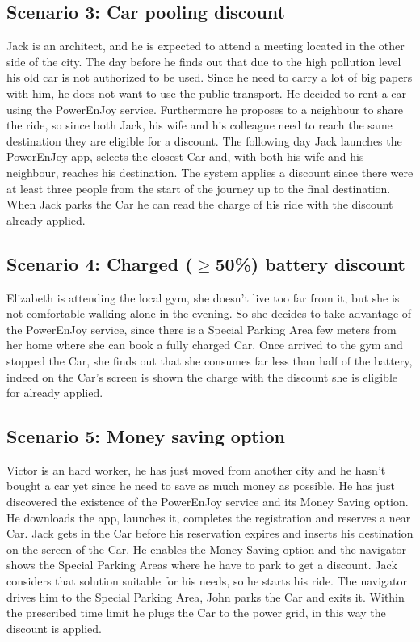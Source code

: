 \subsection{Scenario 3: Car pooling discount}
Jack is an architect, and he is expected to attend a meeting located in the other side of the city. The day before he finds out that due to the high pollution level his old car is not authorized to be used. Since he need to carry a lot of big papers with him, he does not want to use the public transport. He decided to rent a car using the PowerEnJoy service. Furthermore he proposes to a neighbour to share the ride, so since both Jack, his wife and his colleague need to reach the same destination they are eligible for a discount. The following day Jack launches the PowerEnJoy app, selects the closest Car and, with both his wife and his neighbour, reaches his destination. The system applies a discount since there were at least three people from the start of the journey up to the final destination. When Jack parks the Car he can read the charge of his ride with the discount already applied.

\subsection{Scenario 4: Charged ($\geq$50\%) battery discount}
Elizabeth is attending the local gym, she doesn't live too far from it, but she is not comfortable walking alone in the evening. So she decides to take advantage of the PowerEnJoy service, since there is a Special Parking Area few meters from her home where she can book a fully charged Car. Once arrived to the gym and stopped the Car, she finds out that she consumes far less than half of the battery, indeed on the Car's screen is shown the charge with the discount she is eligible for already applied. %

\subsection{Scenario 5: Money saving option}
Victor is an hard worker, he has just moved from another city and he hasn't bought a car yet since he need to save as much money as possible. He has just discovered the existence of the PowerEnJoy service and its Money Saving option. He downloads the app, launches it, completes the registration and reserves a near Car. Jack gets in the Car before his reservation expires and inserts his destination on the screen of the Car. He enables the Money Saving option and the navigator shows the Special Parking Areas where he have to park to get a discount. Jack considers that solution suitable for his needs, so he starts his ride. The navigator drives him to the Special Parking Area, John parks the Car and exits it. Within the prescribed time limit he plugs the Car to the power grid, in this way the discount is applied.

